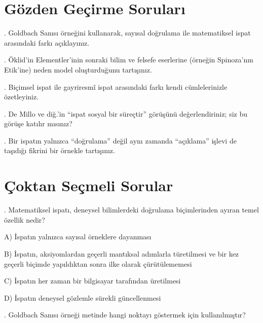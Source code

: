 \section*{Gözden Geçirme Soruları}

\par{}. Goldbach Sanısı örneğini kullanarak, sayısal doğrulama ile matematiksel ispat arasındaki farkı açıklayınız.

\par{}. Öklid’in Elementler’inin sonraki bilim ve felsefe eserlerine (örneğin Spinoza’nın Etik’ine) neden model oluşturduğunu tartışınız.

\par{}. Biçimsel ispat ile gayriresmî ispat arasındaki farkı kendi cümlelerinizle özetleyiniz.

\par{}. De Millo ve diğ.’in “ispat sosyal bir süreçtir” görüşünü değerlendiriniz; siz bu görüşe katılır mısınız?

\par{}. Bir ispatın yalnızca “doğrulama” değil aynı zamanda “açıklama” işlevi de taşıdığı fikrini bir örnekle tartışınız.

\section*{Çoktan Seçmeli Sorular}

\par\smallskip{}. Matematiksel ispatı, deneysel bilimlerdeki doğrulama biçimlerinden ayıran temel özellik nedir?

\par\noindent\hspace*{1.6em}A) İspatın yalnızca sayısal örneklere dayanması

\par\noindent\hspace*{1.6em}B) İspatın, aksiyomlardan geçerli mantıksal adımlarla türetilmesi ve bir kez geçerli biçimde yapıldıktan sonra ilke olarak çürütülememesi

\par\noindent\hspace*{1.6em}C) İspatın her zaman bir bilgisayar tarafından üretilmesi

\par\noindent\hspace*{1.6em}D) İspatın deneysel gözlemle sürekli güncellenmesi

\par\smallskip{}. Goldbach Sanısı örneği metinde hangi noktayı göstermek için kullanılmıştır?

